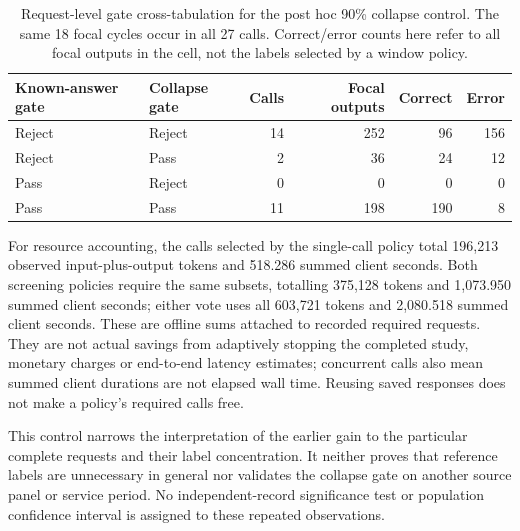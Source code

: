 

\begin{table}[htbp]\centering\small
\caption{Request-level gate cross-tabulation for the post hoc 90\% collapse control. The same 18 focal cycles occur in all 27 calls. Correct/error counts here refer to all focal outputs in the cell, not the labels selected by a window policy.}
\label{tab:canary_gate_crosstab}
\begin{tabular}{@{}llrrrr@{}}\toprule
Known-answer gate & Collapse gate & Calls & Focal outputs & Correct & Error \\\midrule
Reject & Reject & 14 & 252 & 96 & 156 \\
Reject & Pass & 2 & 36 & 24 & 12 \\
Pass & Reject & 0 & 0 & 0 & 0 \\
Pass & Pass & 11 & 198 & 190 & 8 \\\bottomrule
\end{tabular}\end{table}

For resource accounting, the calls selected by the single-call policy total 196,213 observed input-plus-output tokens and 518.286 summed client seconds. Both screening policies require the same subsets, totalling 375,128 tokens and 1,073.950 summed client seconds; either vote uses all 603,721 tokens and 2,080.518 summed client seconds. These are offline sums attached to recorded required requests. They are not actual savings from adaptively stopping the completed study, monetary charges or end-to-end latency estimates; concurrent calls also mean summed client durations are not elapsed wall time. Reusing saved responses does not make a policy's required calls free.

This control narrows the interpretation of the earlier gain to the particular complete requests and their label concentration. It neither proves that reference labels are unnecessary in general nor validates the collapse gate on another source panel or service period. No independent-record significance test or population confidence interval is assigned to these repeated observations.
\FloatBarrier
